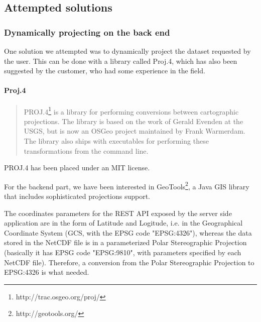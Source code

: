 \documentclass[11pt,a4paper,titlepage,oneside]{report}
\begin{document}
\subsection{Attempted solutions}
\subsubsection{Dynamically projecting on the back end}
One solution we attempted was to dynamically project the dataset requested by the user. This can be done with a library called Proj.4, which has also been suggested by the customer, who had some experience in the field.

\paragraph{Proj.4}
\begin{quote}
PROJ.4\footnote{http://trac.osgeo.org/proj/} is a library for performing conversions between cartographic projections. The library is based on the work of Gerald Evenden at the USGS, but is now an OSGeo project maintained by Frank Warmerdam. The library also ships with executables for performing these transformations from the command line.
\end{quote}
PROJ.4 has been placed under an MIT license. 

For the backend part, we have been interested in GeoTools\footnote{http://geotools.org/}, a Java \gls{GIS} library that includes sophisticated projections support.

The coordinates parameters for the REST \gls{API} exposed by the server side application are in the form of Latitude and Logitude, i.e. in the Geographical Coordinate System (\gls{GCS}, with the EPSG code "EPSG:4326"), whereas the data stored in the NetCDF file is in a parameterized Polar Stereographic Projection (basically it has EPSG code "EPSG:9810", with parameters specified by each NetCDF file).
Therefore, a conversion from the Polar Stereographic Projection to EPSG:4326 is what needed.
\end{document}
